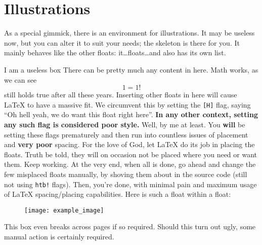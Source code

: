 \section{Illustrations}
As a special gimmick, there is an environment for illustrations.
It may be useless now, but you can alter it to suit your needs; the skeleton is there for you.
It mainly behaves like the other floats: it\dots floats\dots and also has its own list.
\begin{illustration}{I am a useless box}
	There can be pretty much any content in here.
	Math works, as we can see
	\begin{equation}
	1 = 1!
	\end{equation}
	still holds true after all these years.
	Inserting other floats in here will cause \LaTeX{} to have a massive fit.
	We circumvent this by setting the \verb|[H]| flag, saying \enquote{Oh hell yeah, we do want this float right here}.
	\textbf{In any other context, setting any such flag is considered poor style.}
	Well, by me at least.
	You \textbf{will} be setting these flags prematurely and then run into countless issues of placement and \textbf{very poor} spacing.
	For the love of God, let \LaTeX{} do its job in placing the floats.
	Truth be told, they will on occasion not be placed where you need or want them.
	Keep working.
	At the very end, when all is done, go ahead and change the few misplaced floats manually, by shoving them about in the source code (still not using \verb|htb!| flags).
	Then, you're done, with minimal pain and maximum usage of \LaTeX{} spacing/placing capabilities.
	Here is such a float within a float:
	\begin{figure}[H]
		{%
			\texttt{[image: example\_image]}
		}
	\end{figure}
	This box even breaks across pages if so required.
	Should this turn out ugly, some manual action is certainly required.
\end{illustration}